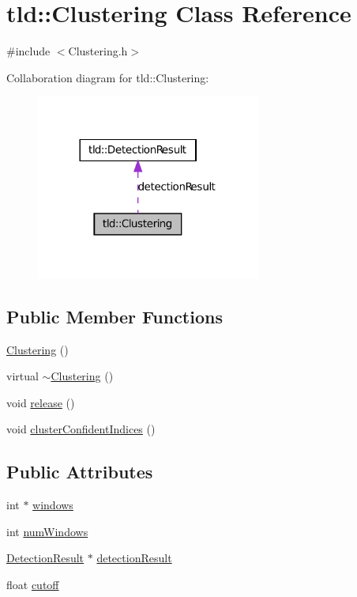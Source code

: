 \hypertarget{classtld_1_1_clustering}{
\section{tld::Clustering Class Reference}
\label{classtld_1_1_clustering}
}


{\ttfamily \#include $<$Clustering.h$>$}



Collaboration diagram for tld::Clustering:
\nopagebreak
\begin{figure}[H]
\begin{center}
\leavevmode
\includegraphics[width=209pt]{classtld_1_1_clustering__coll__graph}
\end{center}
\end{figure}
\subsection*{Public Member Functions}
\begin{DoxyCompactItemize}
\item 
\hyperlink{classtld_1_1_clustering_ae900a3a513ddad5e5b2f5f49d25d8358}{Clustering} ()
\item 
virtual \hyperlink{classtld_1_1_clustering_a86532276b1db43fc44ff201b385c4967}{$\sim$Clustering} ()
\item 
void \hyperlink{classtld_1_1_clustering_a2dbde4a94a483e8befe4b710445941bf}{release} ()
\item 
void \hyperlink{classtld_1_1_clustering_a772750b3a1183ef80a9b4cf202e4c203}{clusterConfidentIndices} ()
\end{DoxyCompactItemize}
\subsection*{Public Attributes}
\begin{DoxyCompactItemize}
\item 
int $\ast$ \hyperlink{classtld_1_1_clustering_acd1251895c2999f2041b50142cf81dda}{windows}
\item 
int \hyperlink{classtld_1_1_clustering_a25b3b82795ea06758b6a321f856f004b}{numWindows}
\item 
\hyperlink{classtld_1_1_detection_result}{DetectionResult} $\ast$ \hyperlink{classtld_1_1_clustering_abfc41de1f95b5c019676aa5f42d9e960}{detectionResult}
\item 
float \hyperlink{classtld_1_1_clustering_ae5fcb2d589b404b081dad28977467707}{cutoff}
\end{DoxyCompactItemize}


